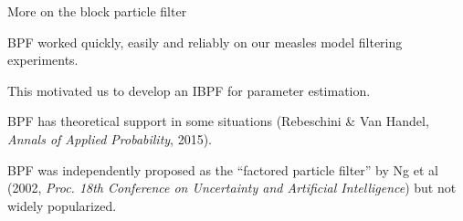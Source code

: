 \documentclass{beamer}
\begin{document}
\begin{frame}{More on the block particle filter}

\bi
\item BPF worked quickly, easily and reliably on our measles model filtering experiments.

\item This motivated us to develop an IBPF for parameter estimation.
   
\item BPF has theoretical support in some situations (Rebeschini \& Van Handel, {\it Annals of Applied Probability}, 2015).

\item BPF was independently proposed as the ``factored particle filter'' by Ng et al (2002, {\it Proc. 18th Conference on Uncertainty and Artificial Intelligence}) but not widely popularized.

\ei

\end{frame}
\end{document}
